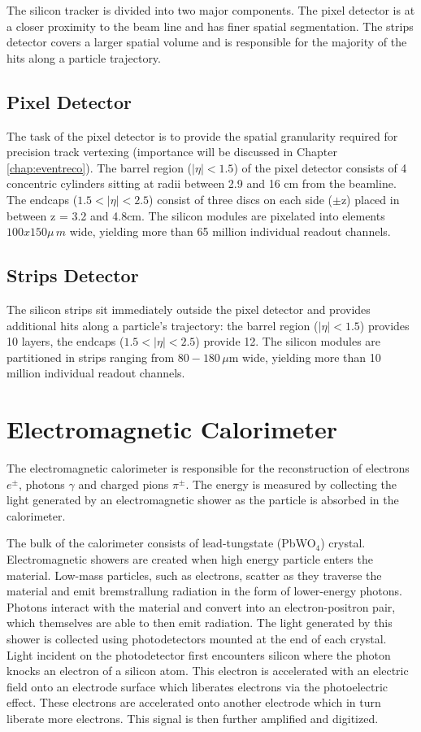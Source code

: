 The silicon tracker is divided into two major components. The pixel detector is at a closer proximity to the beam line and has finer spatial segmentation. The strips detector covers a larger spatial volume and is responsible for the majority of the hits along a particle trajectory.

\subsection{Pixel Detector}

The task of the pixel detector is to provide the spatial granularity required for precision track vertexing (importance will be discussed in Chapter \ref{chap:eventreco}). The barrel region ($|\eta|<1.5$) of the pixel detector consists of 4 concentric cylinders sitting at radii between 2.9 and 16 cm from the beamline. The endcaps ($1.5<|\eta|<2.5$) consist of three discs on each side ($\pm$z) placed in between z = 3.2 and 4.8cm. The silicon modules are pixelated into elements $100x150\mu\,m$ wide, yielding more than 65 million individual readout channels.

\subsection{Strips Detector}

The silicon strips sit immediately outside the pixel detector and provides additional hits along a particle's trajectory: the barrel region ($|\eta|<1.5$) provides 10 layers, the endcaps ($1.5<|\eta|<2.5$) provide 12. The silicon modules are partitioned in strips ranging from $80-180\,\mu$m wide, yielding more than 10 million individual readout channels.

\section{Electromagnetic Calorimeter}

The electromagnetic calorimeter is responsible for the reconstruction of electrons $e^{\pm}$, photons $\gamma$ and charged pions $\pi^{\pm}$. The energy is measured by collecting the light generated by an electromagnetic shower as the particle is absorbed in the calorimeter.\cite{ecaltdr}\cite{ecaltdradd}

The bulk of the calorimeter consists of lead-tungstate (PbWO$_{4}$) crystal. Electromagnetic showers are created when high energy particle enters the material. Low-mass particles, such as electrons, scatter as they traverse the material and emit bremstrallung radiation in the form of lower-energy photons. Photons interact with the material and convert into an electron-positron pair, which themselves are able to then emit radiation. The light generated by this shower is collected using photodetectors mounted at the end of each crystal. Light incident on the photodetector first encounters silicon where the photon knocks an electron of a silicon atom. This electron is accelerated with an electric field onto an electrode surface which liberates electrons via the photoelectric effect. These electrons are accelerated onto another electrode which in turn liberate more electrons. This signal is then further amplified and digitized.

